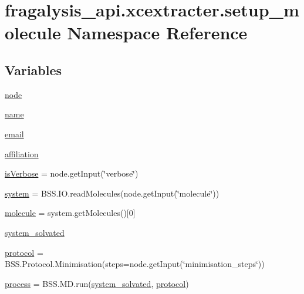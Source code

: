 \hypertarget{namespacefragalysis__api_1_1xcextracter_1_1setup__molecule}{}\section{fragalysis\+\_\+api.\+xcextracter.\+setup\+\_\+molecule Namespace Reference}
\label{namespacefragalysis__api_1_1xcextracter_1_1setup__molecule}
\subsection*{Variables}
\begin{DoxyCompactItemize}
\item 
\hyperlink{namespacefragalysis__api_1_1xcextracter_1_1setup__molecule_a6e5d977af2f726b7652115974b6172e3}{node}
\item 
\hyperlink{namespacefragalysis__api_1_1xcextracter_1_1setup__molecule_ac62c39b5dae94c0398b926ebef77705a}{name}
\item 
\hyperlink{namespacefragalysis__api_1_1xcextracter_1_1setup__molecule_a52d423c9b038caf4d18a97b1715abcc8}{email}
\item 
\hyperlink{namespacefragalysis__api_1_1xcextracter_1_1setup__molecule_aad4256bab5f5df14668e7ccba1d9b463}{affiliation}
\item 
\hyperlink{namespacefragalysis__api_1_1xcextracter_1_1setup__molecule_a6555fe58d1cb225eee77d0e74dd1f7bb}{is\+Verbose} = node.\+get\+Input(\char`\"{}verbose\char`\"{})
\item 
\hyperlink{namespacefragalysis__api_1_1xcextracter_1_1setup__molecule_acab61f5fcadc9988846e8ca1dab4024e}{system} = B\+S\+S.\+I\+O.\+read\+Molecules(node.\+get\+Input(\char`\"{}molecule\char`\"{}))
\item 
\hyperlink{namespacefragalysis__api_1_1xcextracter_1_1setup__molecule_a737c18eeb7107a1b05493ef1af79a42f}{molecule} = system.\+get\+Molecules()\mbox{[}0\mbox{]}
\item 
\hyperlink{namespacefragalysis__api_1_1xcextracter_1_1setup__molecule_a3eab3585c91264e66a041fdb0932fd48}{system\+\_\+solvated}
\item 
\hyperlink{namespacefragalysis__api_1_1xcextracter_1_1setup__molecule_a60658f36df878e49b5cef0787f10b91a}{protocol} = B\+S\+S.\+Protocol.\+Minimisation(steps=node.\+get\+Input(\char`\"{}minimisation\+\_\+steps\char`\"{}))
\item 
\hyperlink{namespacefragalysis__api_1_1xcextracter_1_1setup__molecule_a2cff9ddb655b70c89221382a00670e45}{process} = B\+S\+S.\+M\+D.\+run(\hyperlink{namespacefragalysis__api_1_1xcextracter_1_1setup__molecule_a3eab3585c91264e66a041fdb0932fd48}{system\+\_\+solvated}, \hyperlink{namespacefragalysis__api_1_1xcextracter_1_1setup__molecule_a60658f36df878e49b5cef0787f10b91a}{protocol})
\end{DoxyCompactItemize}


